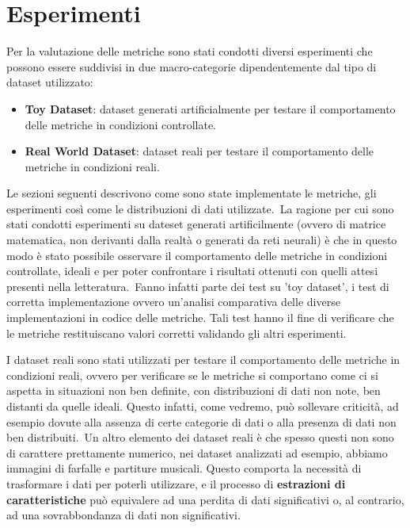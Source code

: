 \chapter{Esperimenti}\label{ch:chapter2}

Per la valutazione delle metriche sono stati condotti diversi esperimenti che possono essere suddivisi in due macro-categorie dipendentemente dal tipo di dataset utilizzato:
\begin{itemize}
    \item \textbf{Toy Dataset}: dataset generati artificialmente per testare il comportamento delle metriche in condizioni controllate.
    \item \textbf{Real World Dataset}: dataset reali per testare il comportamento delle metriche in condizioni reali.
\end{itemize}
Le sezioni seguenti descrivono come sono state implementate le metriche, gli esperimenti così come le distribuzioni di dati utilizzate.\
La ragione per cui sono stati condotti esperimenti su dateset generati artificilmente (ovvero di matrice matematica, non derivanti dalla realtà o generati da reti neurali) è che in questo modo è stato possibile osservare il comportamento delle metriche in condizioni controllate, ideali e per poter confrontare i risultati ottenuti con quelli attesi presenti nella letteratura.\
Fanno infatti parte dei test su 'toy dataset', i test di corretta implementazione ovvero un'analisi comparativa delle diverse implementazioni in codice delle metriche. Tali test hanno il fine di verificare che le metriche restituiscano valori corretti validando gli altri esperimenti.\

I dataset reali sono stati utilizzati per testare il comportamento delle metriche in condizioni reali, ovvero per verificare se le metriche si comportano come ci si aspetta in situazioni non ben definite, con distribuzioni di dati non note, ben distanti da quelle ideali. Questo infatti, come vedremo, può sollevare criticità, ad esempio dovute alla assenza di certe categorie di dati o alla presenza di dati non ben distribuiti.\
Un altro elemento dei dataset reali è che spesso questi non sono di carattere prettamente numerico, nei dataset analizzati ad esempio, abbiamo immagini di farfalle e partiture musicali. Questo comporta la necessità di trasformare i dati per poterli utilizzare, e il processo di \textbf{estrazioni di caratteristiche} può equivalere ad una perdita di dati significativi o, al contrario, ad una sovrabbondanza di dati non significativi.\

